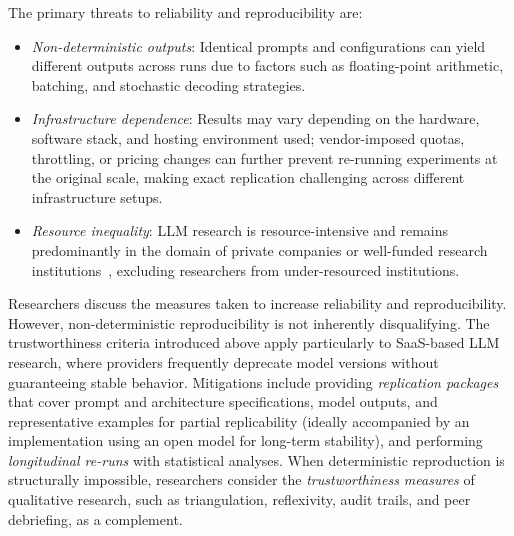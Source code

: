 The primary threats to reliability and reproducibility are:
\begin{itemize}
    \item \emph{Non-deterministic outputs}: Identical prompts and configurations can yield different outputs across runs due to factors such as floating-point arithmetic, batching, and stochastic decoding strategies.
    \item \emph{Infrastructure dependence}: Results may vary depending on the hardware, software stack, and hosting environment used; vendor-imposed quotas, throttling, or pricing changes can further prevent re-running experiments at the original scale, making exact replication challenging across different infrastructure setups.
    \item \emph{Resource inequality}: LLM research is resource-intensive and remains predominantly in the domain of private companies or well-funded research institutions~\cite{schwartz2020green, ahmed2023industry}, excluding researchers from under-resourced institutions.
\end{itemize}

Researchers \must discuss the measures taken to increase reliability and reproducibility.
However, non-deterministic reproducibility is not inherently disqualifying. The trustworthiness criteria introduced above apply particularly to SaaS-based LLM research, where providers frequently deprecate model versions without guaranteeing stable behavior.
Mitigations include providing \emph{replication packages} that cover prompt and architecture specifications, model outputs, and representative examples for partial replicability (ideally accompanied by an implementation using an open model for long-term stability), and performing \emph{longitudinal re-runs} with statistical analyses. When deterministic reproduction is structurally impossible, researchers \should consider the \emph{trustworthiness measures} of qualitative research, such as triangulation, reflexivity, audit trails, and peer debriefing, as a complement.


